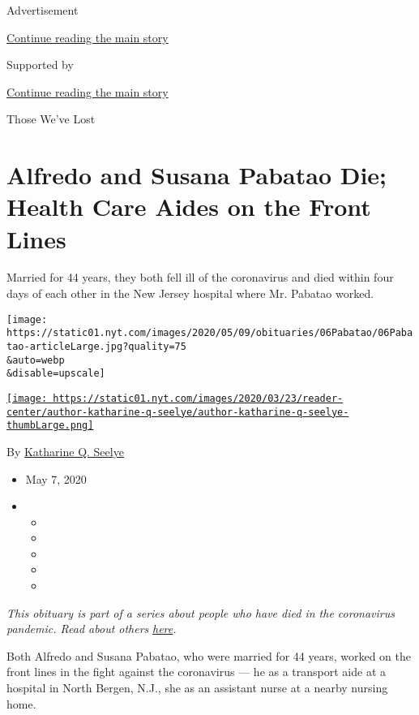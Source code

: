 Advertisement

\protect\hyperlink{after-top}{Continue reading the main story}

Supported by

\protect\hyperlink{after-sponsor}{Continue reading the main story}

Those We've Lost

\hypertarget{alfredo-and-susana-pabatao-die-health-care-aides-on-the-front-lines}{%
\section{Alfredo and Susana Pabatao Die; Health Care Aides on the Front
Lines}\label{alfredo-and-susana-pabatao-die-health-care-aides-on-the-front-lines}}

Married for 44 years, they both fell ill of the coronavirus and died
within four days of each other in the New Jersey hospital where Mr.
Pabatao worked.

\texttt{[image: https://static01.nyt.com/images/2020/05/09/obituaries/06Pabatao/06Pabatao-articleLarge.jpg?quality=75\\\&auto=webp\\\&disable=upscale]}

\href{https://www.nytimes.com/by/katharine-q-seelye}{\texttt{[image: https://static01.nyt.com/images/2020/03/23/reader-center/author-katharine-q-seelye/author-katharine-q-seelye-thumbLarge.png]}}

By \href{https://www.nytimes.com/by/katharine-q-seelye}{Katharine Q.
Seelye}

\begin{itemize}
\item
  May 7, 2020
\item
  \begin{itemize}
  \item
  \item
  \item
  \item
  \item
  \end{itemize}
\end{itemize}

\emph{This obituary is part of a series about people who have died in
the coronavirus pandemic. Read about others}
\href{https://www.nytimes.com/series/people-who-have-died-of-the-coronavirus}{\emph{here}}\emph{.}

Both Alfredo and Susana Pabatao, who were married for 44 years, worked
on the front lines in the fight against the coronavirus --- he as a
transport aide at a hospital in North Bergen, N.J., she as an assistant
nurse at a nearby nursing home.

